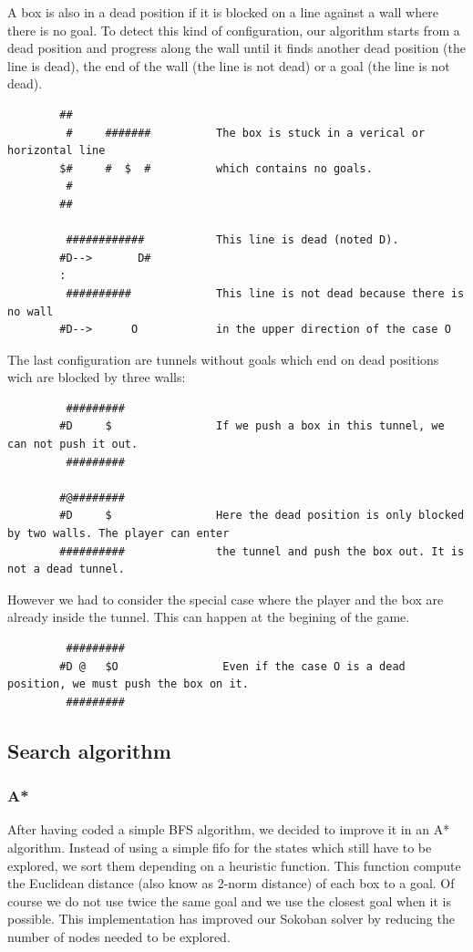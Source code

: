 \documentclass[a4paper,10pt]{article}
\begin{document}
			A box is also in a dead position if it is blocked on a line against a wall where there is no goal.
			To detect this kind of configuration, our algorithm starts from a dead position and progress along the wall until it finds
			another dead position (the line is dead), the end of the wall (the line is not dead) or a goal (the line is not dead).
		\begin{verbatim}
	    ##           
	     #     #######			The box is stuck in a verical or horizontal line
	    $#     #  $  #			which contains no goals.
	     #            
	    ##         

		 ############			This line is dead (noted D).
		#D-->       D#
		:
		 ##########				This line is not dead because there is no wall 
		#D-->      O            in the upper direction of the case O
	    \end{verbatim}

			The last configuration are tunnels without goals which end on dead positions wich are blocked by three walls:
		\begin{verbatim}
		 #########
		#D     $                If we push a box in this tunnel, we can not push it out.
		 #########

		#@########
		#D     $                Here the dead position is only blocked by two walls. The player can enter
		##########              the tunnel and push the box out. It is not a dead tunnel.
		\end{verbatim}

		However we had to consider the special case where the player and the box are already inside the tunnel. 
		This can happen at the begining of the game.
		\begin{verbatim}
		 #########
		#D @   $O                Even if the case O is a dead position, we must push the box on it.
		 #########
		\end{verbatim}

            
            
	\subsection{Search algorithm}
	\subsubsection{A*}
	After having coded a simple BFS algorithm, we decided to improve it in an A* algorithm. 
	Instead of using a simple fifo for the states which still have to be explored, we sort them depending on a heuristic function. 
	This function compute the Euclidean distance (also know as 2-norm distance) of each  box to a goal. 
	Of course we do not use twice the same goal and we use the closest goal when it is possible. 
	This implementation has improved our Sokoban solver by reducing the number of nodes needed to be explored.
\end{document}
